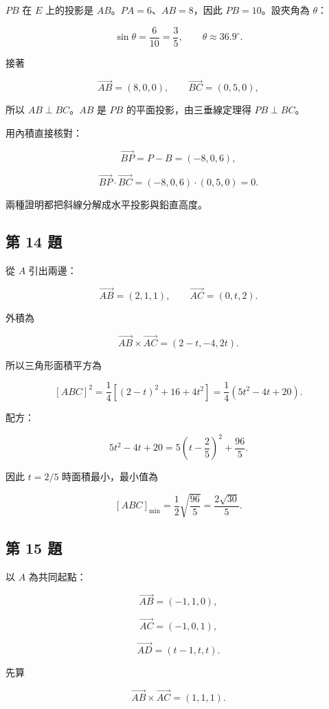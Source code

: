 \documentclass[11pt,a4paper]{article}
\begin{document}
\(PB\) 在 \(E\) 上的投影是 \(AB\)。\(PA=6\)、\(AB=8\)，因此 \(PB=10\)。設夾角為 \(\theta\)：

\[
\sin\theta=\frac6{10}=\frac35,
\qquad
\boxed{\theta\approx36.9^\circ}.
\]

接著

\[
\overrightarrow{AB}=(8,0,0),
\qquad
\overrightarrow{BC}=(0,5,0),
\]

所以 \(AB\perp BC\)。\(AB\) 是 \(PB\) 的平面投影，由三垂線定理得 \(PB\perp BC\)。

用內積直接核對：

\[
\overrightarrow{BP}=P-B=(-8,0,6),
\]

\[
\overrightarrow{BP}\cdot\overrightarrow{BC}
=(-8,0,6)\cdot(0,5,0)=0.
\]

兩種證明都把斜線分解成水平投影與鉛直高度。

\subsection{第 14 題}\label{ux7b2c-14-ux984c}

從 \(A\) 引出兩邊：

\[
\overrightarrow{AB}=(2,1,1),
\qquad
\overrightarrow{AC}=(0,t,2).
\]

外積為

\[
\overrightarrow{AB}\times\overrightarrow{AC}
=(2-t,-4,2t).
\]

所以三角形面積平方為

\[
[ABC]^2
=\frac14\left[(2-t)^2+16+4t^2\right]
=\frac14(5t^2-4t+20).
\]

配方：

\[
5t^2-4t+20
=5\left(t-\frac25\right)^2+\frac{96}{5}.
\]

因此 \(t=2/5\) 時面積最小，最小值為

\[
\boxed{
[ABC]_{\min}
=\frac12\sqrt{\frac{96}{5}}
=\frac{2\sqrt{30}}5
}.
\]

\subsection{第 15 題}\label{ux7b2c-15-ux984c}

以 \(A\) 為共同起點：

\[
\overrightarrow{AB}=(-1,1,0),
\]

\[
\overrightarrow{AC}=(-1,0,1),
\]

\[
\overrightarrow{AD}=(t-1,t,t).
\]

先算

\[
\overrightarrow{AB}\times\overrightarrow{AC}=(1,1,1).
\]
\end{document}
